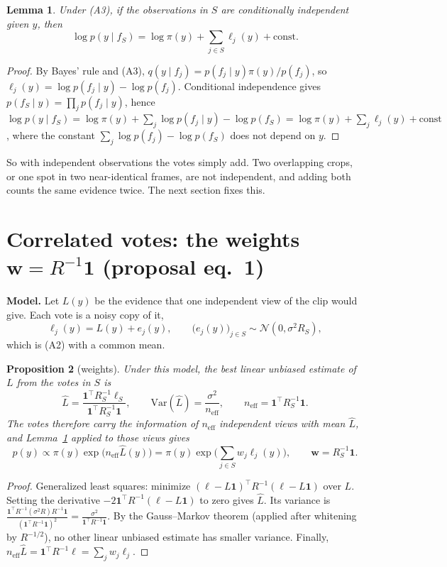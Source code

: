 \documentclass[11pt]{article}
\theoremstyle{plain}
\newtheorem{prop}{Proposition}
\newtheorem{lem}[prop]{Lemma}
\theoremstyle{remark}
\newcommand{\Var}{\mathrm{Var}}
\newcommand{\one}{\mathbf{1}}
\begin{document}
\begin{lem}\label{lem:naive}
Under (A3), if the observations in $S$ are conditionally independent given $y$, then
\[ \log p(y\mid f_S) = \log\pi(y) + \sum_{j\in S}\ell_j(y) + \text{const}. \]
\end{lem}
\begin{proof}
By Bayes' rule and (A3), $q(y\mid f_j)=p(f_j\mid y)\pi(y)/p(f_j)$, so $\ell_j(y)=\log p(f_j\mid y)-\log p(f_j)$. Conditional independence gives $p(f_S\mid y)=\prod_j p(f_j\mid y)$, hence
$\log p(y\mid f_S)=\log\pi(y)+\sum_j\log p(f_j\mid y)-\log p(f_S)=\log\pi(y)+\sum_j\ell_j(y)+\text{const}$,
where the constant $\sum_j\log p(f_j)-\log p(f_S)$ does not depend on $y$.
\end{proof}

So with independent observations the votes simply add. Two overlapping crops, or one spot in two near-identical frames, are not independent, and adding both counts the same evidence twice. The next section fixes this.

\section{\texorpdfstring{Correlated votes: the weights $\bm w=R^{-1}\one$ (proposal eq.~1)}{Correlated votes: the weights (proposal eq. 1)}}

\textbf{Model.} Let $L(y)$ be the evidence that one independent view of the clip would give. Each vote is a noisy copy of it,
\[ \ell_j(y)=L(y)+e_j(y),\qquad \big(e_j(y)\big)_{j\in S}\sim\mathcal N(0,\sigma^2R_S), \]
which is (A2) with a common mean.

\begin{prop}[weights]\label{prop:weights}
Under this model, the best linear unbiased estimate of $L$ from the votes in $S$ is
\[ \hat L=\frac{\one^\top R_S^{-1}\bm\ell_S}{\one^\top R_S^{-1}\one},\qquad \Var(\hat L)=\frac{\sigma^2}{n_{\text{eff}}},\qquad n_{\text{eff}}=\one^\top R_S^{-1}\one . \]
The votes therefore carry the information of $n_{\text{eff}}$ independent views with mean $\hat L$, and Lemma~\ref{lem:naive} applied to those views gives
\[ p(y)\propto\pi(y)\exp\big(n_{\text{eff}}\hat L(y)\big)=\pi(y)\exp\Big(\sum_{j\in S}w_j\ell_j(y)\Big),\qquad \bm w=R_S^{-1}\one . \]
\end{prop}
\begin{proof}
Generalized least squares: minimize $(\bm\ell-L\one)^\top R^{-1}(\bm\ell-L\one)$ over $L$. Setting the derivative $-2\one^\top R^{-1}(\bm\ell-L\one)$ to zero gives $\hat L$. Its variance is $\frac{\one^\top R^{-1}(\sigma^2R)R^{-1}\one}{(\one^\top R^{-1}\one)^2}=\frac{\sigma^2}{\one^\top R^{-1}\one}$. By the Gauss--Markov theorem (applied after whitening by $R^{-1/2}$), no other linear unbiased estimate has smaller variance. Finally, $n_{\text{eff}}\hat L=\one^\top R^{-1}\bm\ell=\sum_j w_j\ell_j$.
\end{proof}
\end{document}
